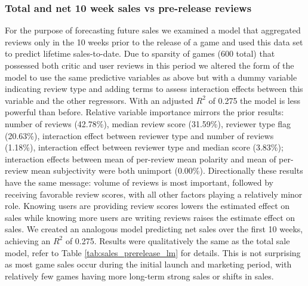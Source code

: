 \documentclass[letterpaper]{article}
\begin{document}
\subsubsection{Total and net 10 week sales vs pre-release reviews}
For the purpose of forecasting future sales we examined a model that aggregated reviews only in the 10 weeks prior to the release of a game and used this data set to predict lifetime sales-to-date. Due to sparsity of games (600 total) that possessed both critic and user reviews in this period we altered the form of the model to use the same predictive variables as above but with a dummy variable indicating review type and adding terms to assess interaction effects between this variable and the other regressors. With an adjusted $R^2$ of 0.275 the model is less powerful than before. Relative variable importance mirrors the prior results: number of reviews (42.78\%), median review score (31.59\%), reviewer type flag (20.63\%), interaction effect between reviewer type and number of reviews (1.18\%), interaction effect between reviewer type and median score (3.83\%); interaction effects between mean of per-review mean polarity and mean of per-review mean subjectivity were both unimport (0.00\%). Directionally these results have the same message: volume of reviews is most important, followed by receiving favorable review scores, with all other factors playing a relatively minor role. Knowing users are providing review scores lowers the estimated effect on sales while knowing more users are writing reviews raises the estimate effect on sales. We created an analogous model predicting net sales over the first 10 weeks, achieving an $R^2$ of 0.275. Results were qualitatively the same as the total sale model, refer to Table \ref{tab:sales_prerelease_lm} for details. This is not surprising as most game sales occur during the initial launch and marketing period, with relatively few games having more long-term strong sales or shifts in sales.
\end{document}
